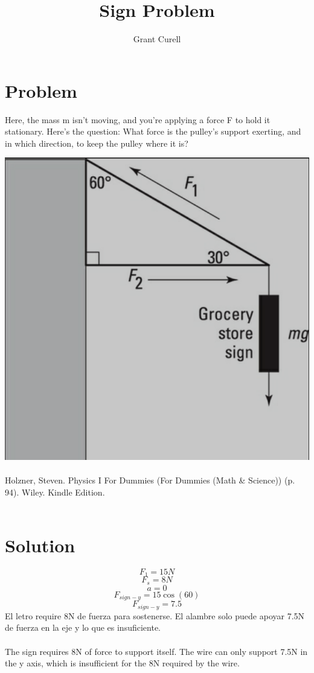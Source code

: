 \documentclass{article}
\title{Sign Problem}
\author{Grant Curell}
\begin{document}
\maketitle{}
\section{Problem}
Here, the mass m isn’t moving, and you’re applying a force F to hold it stationary. Here’s the question: What force is the pulley’s support exerting, and in which direction, to keep the pulley where it is?

\includegraphics[width=\columnwidth]{image}
\\\\
Holzner, Steven. Physics I For Dummies (For Dummies (Math \& Science)) (p. 94). Wiley. Kindle Edition.
\\\\
\section{Solution}
\[ F_1=15N \]
\[ F_s=8N \]
\[ a=0 \]
\[ F_{sign-y}=15\cos(60) \]
\[ F_{sign-y}=7.5 \]
El letro require 8N de fuerza para sostenerse. El alambre solo puede apoyar 7.5N de fuerza en la eje y lo que es insuficiente.
\\\\
The sign requires 8N of force to support itself. The wire can only support 7.5N in the y axis, which is insufficient for the 8N required by the wire.
\end{document}
